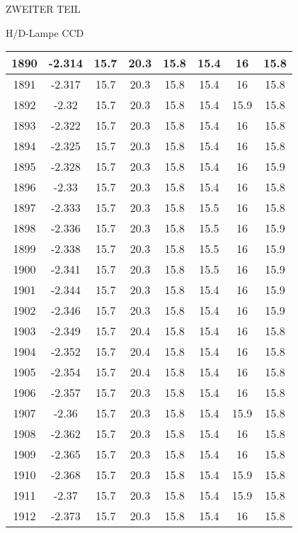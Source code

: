 \begin{appendix}
\begin{chapter}{ZWEITER TEIL}
\begin{section}{H/D-Lampe CCD}
\begin{scriptsize}
\begin{longtable}[htbp]{|c|c|c|c|c|c|c|c|}
            1890 & -2.314 & 15.7 & 20.3 & 15.8 & 15.4 & 16 & 15.8 \\ \hline
            1891 & -2.317 & 15.7 & 20.3 & 15.8 & 15.4 & 16 & 15.8 \\ \hline
            1892 & -2.32 & 15.7 & 20.3 & 15.8 & 15.4 & 15.9 & 15.8 \\ \hline
            1893 & -2.322 & 15.7 & 20.3 & 15.8 & 15.4 & 16 & 15.8 \\ \hline
            1894 & -2.325 & 15.7 & 20.3 & 15.8 & 15.4 & 16 & 15.8 \\ \hline
            1895 & -2.328 & 15.7 & 20.3 & 15.8 & 15.4 & 16 & 15.9 \\ \hline
            1896 & -2.33 & 15.7 & 20.3 & 15.8 & 15.4 & 16 & 15.8 \\ \hline
            1897 & -2.333 & 15.7 & 20.3 & 15.8 & 15.5 & 16 & 15.8 \\ \hline
            1898 & -2.336 & 15.7 & 20.3 & 15.8 & 15.5 & 16 & 15.9 \\ \hline
            1899 & -2.338 & 15.7 & 20.3 & 15.8 & 15.5 & 16 & 15.9 \\ \hline
            1900 & -2.341 & 15.7 & 20.3 & 15.8 & 15.5 & 16 & 15.9 \\ \hline
            1901 & -2.344 & 15.7 & 20.3 & 15.8 & 15.4 & 16 & 15.9 \\ \hline
            1902 & -2.346 & 15.7 & 20.3 & 15.8 & 15.4 & 16 & 15.9 \\ \hline
            1903 & -2.349 & 15.7 & 20.4 & 15.8 & 15.4 & 16 & 15.8 \\ \hline
            1904 & -2.352 & 15.7 & 20.4 & 15.8 & 15.4 & 16 & 15.8 \\ \hline
            1905 & -2.354 & 15.7 & 20.4 & 15.8 & 15.4 & 16 & 15.8 \\ \hline
            1906 & -2.357 & 15.7 & 20.3 & 15.8 & 15.4 & 16 & 15.8 \\ \hline
            1907 & -2.36 & 15.7 & 20.3 & 15.8 & 15.4 & 15.9 & 15.8 \\ \hline
            1908 & -2.362 & 15.7 & 20.3 & 15.8 & 15.4 & 16 & 15.8 \\ \hline
            1909 & -2.365 & 15.7 & 20.3 & 15.8 & 15.4 & 16 & 15.8 \\ \hline
            1910 & -2.368 & 15.7 & 20.3 & 15.8 & 15.4 & 15.9 & 15.8 \\ \hline
            1911 & -2.37 & 15.7 & 20.3 & 15.8 & 15.4 & 15.9 & 15.8 \\ \hline
            1912 & -2.373 & 15.7 & 20.3 & 15.8 & 15.4 & 16 & 15.8 \\ \hline

\end{longtable}
\end{scriptsize}
\end{section}
\end{chapter}
\end{appendix}

